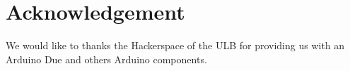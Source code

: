 \section{Acknowledgement}

We would like to thanks the Hackerspace of the ULB for providing us with an Arduino Due and others Arduino components.